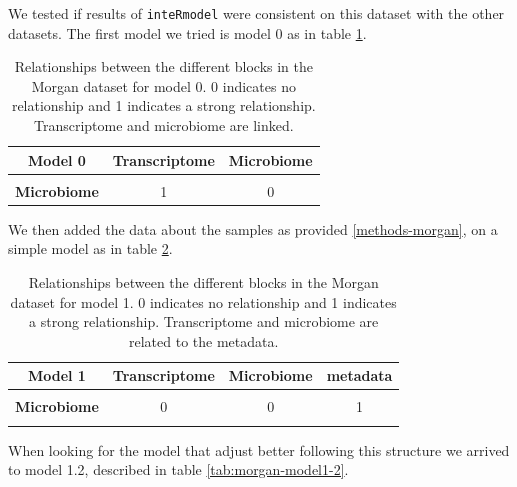 \documentclass[
  12pt,
  a4paper,
  twoside,
  openright]{book}
\begin{document}
We tested if results of \texttt{inteRmodel} were consistent on this dataset with the other datasets.
The first model we tried is model 0 as in table \ref{tab:morgan-model0}.

\begin{table}[H]

\caption[Model 0 of the Morgan dataset.]{\label{tab:morgan-model0}Relationships between the different blocks in the Morgan dataset for model 0. 0 indicates no relationship and 1 indicates a strong relationship. Transcriptome and microbiome are linked.}
\centering
\begin{tabular}[t]{>{}c|c|c}
\hline
\textbf{Model 0} & \textbf{Transcriptome} & \textbf{Microbiome}\\
\hline
\textbf{\cellcolor{gray!6}{Transcriptome}} & \cellcolor{gray!6}{0} & \cellcolor{gray!6}{1}\\
\hline
\textbf{Microbiome} & 1 & 0\\
\hline
\end{tabular}
\end{table}

We then added the data about the samples as provided \ref{methods-morgan}, on a simple model as in table \ref{tab:morgan-model1}.

\begin{table}[H]

\caption[Model 1 of the Morgan dataset.]{\label{tab:morgan-model1}Relationships between the different blocks in the Morgan dataset for model 1. 0 indicates no relationship and 1 indicates a strong relationship. Transcriptome and microbiome are related to the metadata.}
\centering
\begin{tabular}[t]{>{}c|c|c|c}
\hline
\textbf{Model 1} & \textbf{Transcriptome} & \textbf{Microbiome} & \textbf{metadata}\\
\hline
\textbf{\cellcolor{gray!6}{Transcriptome}} & \cellcolor{gray!6}{0} & \cellcolor{gray!6}{0} & \cellcolor{gray!6}{1}\\
\hline
\textbf{Microbiome} & 0 & 0 & 1\\
\hline
\textbf{\cellcolor{gray!6}{metadata}} & \cellcolor{gray!6}{1} & \cellcolor{gray!6}{1} & \cellcolor{gray!6}{0}\\
\hline
\end{tabular}
\end{table}

When looking for the model that adjust better following this structure we arrived to model 1.2, described in table \ref{tab:morgan-model1-2}.
\end{document}

